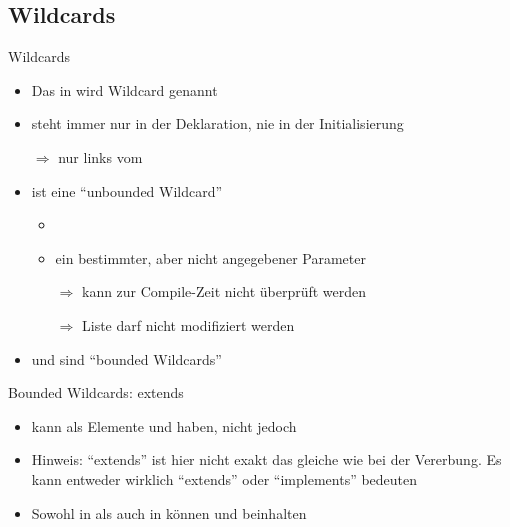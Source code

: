 \documentclass[usepdftitle=false,hyperref={pdfpagelabels=false}]{beamer}
\begin{document}
\subsection{Wildcards}
\begin{frame}{Wildcards}
    \begin{itemize}[<+->]
        \item Das  in  wird Wildcard
              genannt
        \item {} steht immer nur in der Deklaration, nie in der Initialisierung
        \item[$\Rightarrow$]  nur links vom \myCode{=}
        \item {} ist eine "`unbounded Wildcard"'
            \begin{itemize}
                \item \inputminted[linenos=false, numbersep=5pt, tabsize=4, fontsize=\tiny, firstline=1, lastline=3]{java}{singleLines.java}
                \item {} ein bestimmter, aber nicht angegebener Parameter\\
                \item[$\Rightarrow$] kann zur Compile-Zeit nicht überprüft werden\\
                \item[$\Rightarrow$] Liste darf nicht modifiziert werden
            \end{itemize}
        \item {} und  sind "`bounded Wildcards"'
    \end{itemize}
\end{frame}

\begin{frame}{Bounded Wildcards: extends}
    \begin{itemize}[<+->]
        \item {} kann als Elemente
               und  haben, nicht jedoch
        \item Hinweis: "`extends"' ist hier nicht exakt das gleiche 
              wie bei der Vererbung. Es kann entweder wirklich "`extends"'
              oder "`implements"' bedeuten
        \item Sowohl in  als auch in 
               können
               und  beinhalten
    \end{itemize}
\end{frame}
\end{document}

